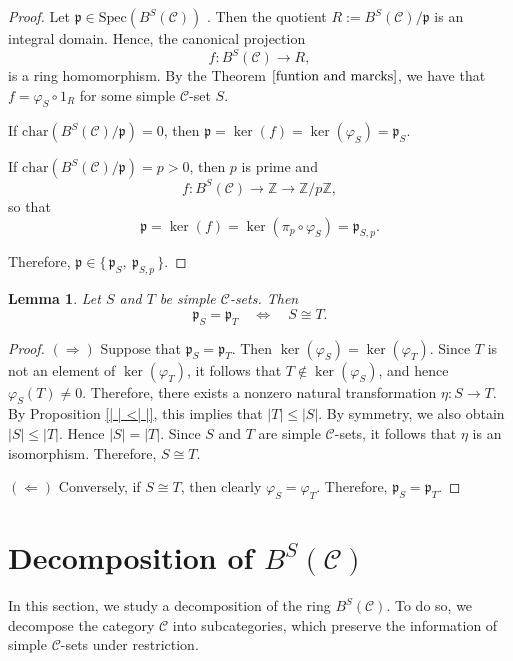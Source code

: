 \documentclass[a4paper]{article}
\newtheorem{lem}[thm]{Lemma}
\theoremstyle{definition}
\theoremstyle{remark}
\newcommand*{\cat}[1]{\mathcal{#1}}
\begin{document}
\begin{proof}
Let $\mathfrak{p} \in \mathrm{Spec}(B^S(\cat{C}))$ .  Then the quotient $ R:=B^S(\cat{C})/\mathfrak{p}$
is an integral domain.
Hence, the canonical projection 
\[
f \colon B^S(\cat{C}) \longrightarrow R,
\]
is a ring homomorphism. 
By the Theorem $\ref{funtion and marcks}$,  we have that $ f = \varphi_S \circ 1_R$ 
for some simple $\cat{C}$-set $S$.

If $\mathrm{char}(B^S(\cat{C})/\mathfrak{p}) = 0$, then
$ \mathfrak{p} = \ker(f) = \ker(\varphi_S) = \mathfrak{p}_S.$

If $\mathrm{char}(B^S(\cat{C})/\mathfrak{p}) = p > 0$, then $p$ is prime and
\[
f \colon B^S(\cat{C}) \longrightarrow \mathbb{Z} \longrightarrow \mathbb{Z}/p\mathbb{Z},
\]
so that
\[
\mathfrak{p} = \ker(f) = \ker(\pi_p \circ \varphi_S) = \mathfrak{p}_{S,p}.
\]

Therefore, $\mathfrak{p} \in \{\, \mathfrak{p}_S,\ \mathfrak{p}_{S,p} \,\}.
 $
\end{proof}

\begin{lem}
Let $S$ and $T$ be simple $\cat{C}$-sets. Then
\[
\mathfrak{p}_S = \mathfrak{p}_T \quad \Longleftrightarrow \quad S \cong T.
\]
\end{lem}

\begin{proof}
$(\Rightarrow)$ Suppose that $\mathfrak{p}_S=\mathfrak{p}_T$. Then
$\ker(\varphi_S)=\ker(\varphi_T)$.
Since $T$ is not an element of  $\ker(\varphi_T)$, it follows that $T\notin \ker(\varphi_S)$, and hence
$\varphi_S(T)\neq 0$.
Therefore, there exists a nonzero natural transformation
$\eta:S\to T$.
By Proposition \ref{| | <| |}, this implies that $|T|\leq |S|$. By symmetry, we also obtain $|S|\leq |T|$. Hence $|S|=|T|$. Since $S$ and $T$ are simple $\cat{C}$-sets, it follows that $\eta$ is an isomorphism. Therefore, $S\cong T$.

$(\Leftarrow)$ Conversely, if $S\cong T$, then clearly $\varphi_S=\varphi_T$. Therefore,
$\mathfrak{p}_S=\mathfrak{p}_T$.
\end{proof}


\section{Decomposition of  $B^S(\cat{C})$}\label{descompositon}

In this section, we study a decomposition of the ring $B^S(\cat{C})$. To do so, we decompose the category $\cat{C}$ into subcategories, which preserve the information of simple $\cat{C}$-sets under restriction.
\end{document}
